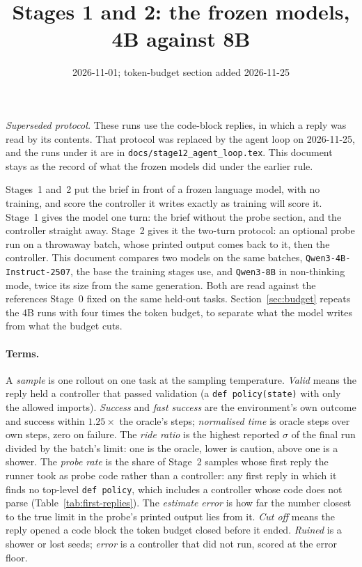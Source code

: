 \documentclass[11pt,a4paper]{article}
\title{\textbf{Stages 1 and 2: the frozen models, 4B against 8B}}
\author{}
\date{2026-11-01; token-budget section added 2026-11-25}
\begin{document}
\maketitle

\noindent
\emph{Superseded protocol.} These runs use the code-block replies, in which a
reply was read by its contents. That protocol was replaced by the agent loop
on 2026-11-25, and the runs under it are in
\texttt{docs/stage12\_agent\_loop.tex}. This document stays as the record of
what the frozen models did under the earlier rule.

\noindent
Stages~1 and~2 put the brief in front of a frozen language model, with no
training, and score the controller it writes exactly as training will score
it. Stage~1 gives the model one turn: the brief without the probe section,
and the controller straight away. Stage~2 gives it the two-turn protocol: an
optional probe run on a throwaway batch, whose printed output comes back to
it, then the controller. This document compares two models on the same
batches, \texttt{Qwen3-4B-Instruct-2507}, the base the training stages use,
and \texttt{Qwen3-8B} in non-thinking mode, twice its size from the same
generation. Both are read against the references Stage~0 fixed on the same
held-out tasks. Section~\ref{sec:budget} repeats the 4B runs with four times
the token budget, to separate what the model writes from what the budget cuts.

\paragraph{Terms.} A \emph{sample} is one rollout on one task at the sampling
temperature. \emph{Valid} means the reply held a controller that passed
validation (a \texttt{def policy(state)} with only the allowed imports).
\emph{Success} and \emph{fast success} are the environment's own outcome and
success within $1.25\times$ the oracle's steps; \emph{normalised time} is
oracle steps over own steps, zero on failure. The \emph{ride ratio} is the
highest reported $\sigma$ of the final run divided by the batch's limit: one
is the oracle, lower is caution, above one is a shower. The \emph{probe rate}
is the share of Stage~2 samples whose first reply the runner took as probe
code rather than a controller: any first reply in which it finds no top-level
\texttt{def policy}, which includes a controller whose code does not parse
(Table~\ref{tab:first-replies}). The \emph{estimate error} is how far the number closest to the
true limit in the probe's printed output lies from it. \emph{Cut off} means
the reply opened a code block the token budget closed before it ended.
\emph{Ruined} is a shower or lost seeds; \emph{error} is a controller that
did not run, scored at the error floor.
\end{document}
